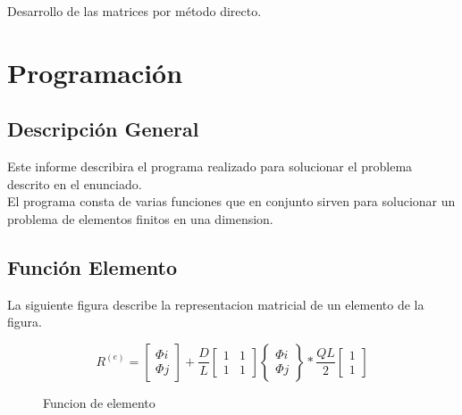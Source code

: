 \documentclass{article}
\begin{document}
Desarrollo de las matrices por método directo.

\section{Programación}

\subsection{Descripción General}
Este informe describira el programa realizado para solucionar el problema descrito en el enunciado.\\
El programa consta de varias funciones que en conjunto sirven para solucionar un problema de elementos finitos en una dimension.

\subsection{Función Elemento}
La siguiente figura describe la representacion matricial de un elemento de la figura.
\begin{figure}[!h]
    \begin{equation}
        R^{(e)}=\left[ \begin{array}{cc}
            \Phi i  \\
            \Phi j
            \end{array}\right]+\frac{D}{L}
            \left[\begin{array}{cccc}
                1 & 1 \\
                1 & 1
                \end{array}
            \right]
            \left\lbrace \begin{array}{cc}
                \Phi i  \\
                \Phi j
                \end{array}\right\rbrace
                *
                \frac {QL}{2} \left[ \begin{array}{cccc}
                    1  \\
                    1
                    \end{array}\right]
        \end{equation}
        \caption{Funcion de elemento}
    \end{figure}
\end{document}
